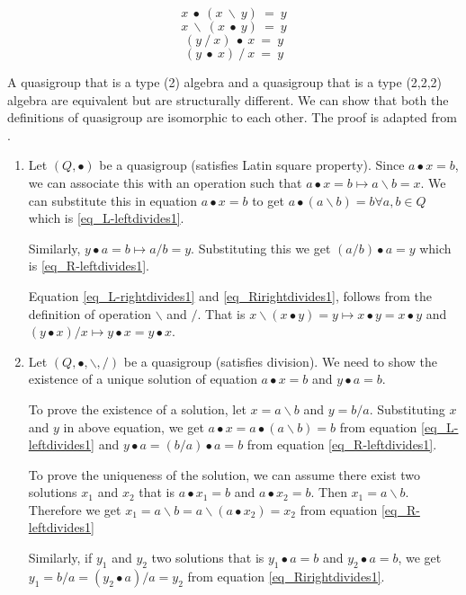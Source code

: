 \begin{equation} \label{eq_L-leftdivides1}
  x\ ∙\ (x\ \backslash\ y) \ = \ y
\end{equation}
\begin{equation} \label{eq_L-rightdivides1}
  x\ \backslash\ (x\ ∙\ y)\ = \ y
\end{equation}
\begin{equation} \label{eq_R-leftdivides1}
  (y\ /\ x)\ ∙\ x \ =\ y
\end{equation}
\begin{equation} \label{eq_Rirightdivides1}
  (y\ ∙\ x)\ /\ x \ =\ y
\end{equation}

A quasigroup that is a type (2) algebra and a quasigroup that is a type (2,2,2)
algebra are equivalent but are structurally different. We can show that both the
definitions of quasigroup are isomorphic to each other. The proof is adapted
from \cite{shcherbacov2003elements}.

\begin{enumerate}
  \item 
  Let $(Q, ∙)$ be a quasigroup (satisfies Latin square property). Since $ a ∙ x =
  b$, we can associate this with an operation such that $a ∙ x = b \mapsto a
  \backslash b = x$. We can substitute this in equation $a ∙ x = b$ to get $a ∙ (a
  \backslash b) = b \forall a,b \in Q$ which is \ref{eq_L-leftdivides1}.

  Similarly, $y ∙ a = b \mapsto a / b = y$. Substituting this we get $ (a / b) ∙ a
  = y$ which is \ref{eq_R-leftdivides1}.

  Equation \ref{eq_L-rightdivides1} and \ref{eq_Rirightdivides1}, follows from the
  definition of operation $\backslash$ and $/$. That is $x \backslash (x ∙ y) = y \mapsto x
  ∙ y = x ∙ y$ and $(y ∙ x) /x \mapsto y ∙ x = y ∙ x$.

\item 
  Let $(Q,∙, \backslash, /)$ be a quasigroup (satisfies division). We need to show
  the existence of a unique solution of equation $ a ∙ x = b$ and $y ∙ a = b$.

  To prove the existence of a solution, let $x = a\backslash b$ and $y = b / a$.
  Substituting $x$ and $y$ in above equation, we get $a ∙ x = a ∙ (a \backslash b)
  = b$ from equation \ref{eq_L-leftdivides1} and $ y ∙ a = (b / a) ∙ a = b$ from
  equation \ref{eq_R-leftdivides1}.

  To prove the uniqueness of the solution, we can assume there exist two solutions
  $x_1$ and $x_2$ that is $a ∙ x_1 = b$ and $a ∙ x_2 = b$. Then $x_1 = a
  \backslash b$. Therefore we get $x_1 = a \backslash b = a \backslash (a ∙ x_2) =
  x_2$ from equation \ref{eq_R-leftdivides1}

  Similarly, if $y_1$ and $y_2$ two solutions that is $y_1 ∙ a = b$ and $y_2 ∙ a = b$, we get 
  $y_1 = b / a = (y_2 ∙ a) / a = y_2$ from equation \ref{eq_Rirightdivides1}.

\end{enumerate}

